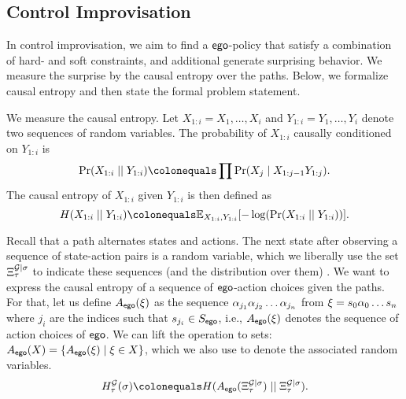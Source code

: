 {{{\subsection{Control Improvisation}
In control improvisation, we aim to find a $\pOne$-policy that satisfy a combination of hard- and soft constraints, and additional generate surprising behavior. 
We measure the surprise by the causal entropy over the paths. Below, we formalize causal entropy and then state the formal problem statement. 

We measure the causal entropy. Let $X_{1:i} = X_1, \hdots, X_i$ and $Y_{1:i} = Y_1,\hdots,Y_i$ denote two sequences of random variables. The probability of $ X_{1:i}$ causally conditioned on $Y_{1:i}$ is 
\[ \causalprob{X_{1:i}}{Y_{1:i}} \colonequals \prod \Pr(X_j \mid X_{1:j-1}Y_{1:j}). \]
The causal entropy of $X_{1:i}$ given $Y_{1:i}$ is then defined as 
\[  H(X_{1:i}\mid\mid Y_{1:i}) \colonequals \expOver{X_{1:i},Y_{1:i}}{-\log(\causalprob{X_{1:i}}{Y_{1:i}})}.\] 

 Recall that a path alternates states and actions. 
 The next state after observing a sequence of state-action pairs is a random variable, which we liberally use the set $\Paths[\tau]{\sg \mid \sched}$ to indicate these sequences (and the distribution over them) .  We want to express the causal entropy of a sequence of $\pOne$-action choices given the paths. 
 For that, let us define $\Act_\pOne(\path)$ as the sequence $\act_{j_1} \act_{j_2} \hdots \act_{j_n}$ from $\path = s_0\act_0\hdots s_n$ where $j_i$ are the indices such that $s_{j_i} \in S_\pOne$, i.e., 
 $\Act_\pOne(\path)$ denotes the sequence of action choices of $\pOne$. We can lift the operation to sets: $\Act_\pOne(X) = \{ \Act_\pOne(\path) \mid \path \in X \}$, which we also use to denote the associated random variables.
\[ H^\sg_\tau(\sigma) \colonequals H( \Act_\pOne(\Paths[\tau]{\sg \mid \sched})   \mid\mid \Paths[\tau]{\sg \mid \sched} ).  \]


\begin{example}
	
\end{example}

}}}
